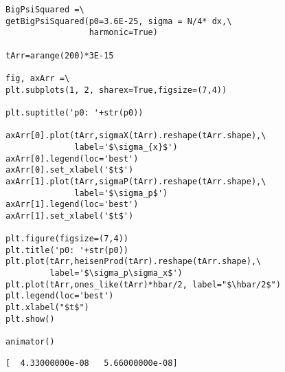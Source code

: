 \documentclass[11pt]{article}
\begin{document}
\begin{lstlisting}
BigPsiSquared =\
getBigPsiSquared(p0=3.6E-25, sigma = N/4* dx,\
                 harmonic=True)

tArr=arange(200)*3E-15

fig, axArr =\
plt.subplots(1, 2, sharex=True,figsize=(7,4))

plt.suptitle('p0: '+str(p0))

axArr[0].plot(tArr,sigmaX(tArr).reshape(tArr.shape),\
              label='$\sigma_{x}$')
axArr[0].legend(loc='best')
axArr[0].set_xlabel('$t$')
axArr[1].plot(tArr,sigmaP(tArr).reshape(tArr.shape),\
              label='$\sigma_p$')
axArr[1].legend(loc='best')
axArr[1].set_xlabel('$t$')

plt.figure(figsize=(7,4))
plt.title('p0: '+str(p0))
plt.plot(tArr,heisenProd(tArr).reshape(tArr.shape),\
         label='$\sigma_p\sigma_x$')
plt.plot(tArr,ones_like(tArr)*hbar/2, label="$\hbar/2$")
plt.legend(loc='best')
plt.xlabel("$t$")
plt.show()

animator()
\end{lstlisting}%
    
\begin{figure}
    \begin{center}
    \end{center}
\end{figure}
    
    
\begin{figure}
    \begin{center}
    \end{center}
\end{figure}
    
    \begin{Verbatim}[commandchars=\\\{\}]
[  4.33000000e-08   5.66000000e-08]

    \end{Verbatim}

    
    

    

    
    
%
%

    
    
\end{document}
